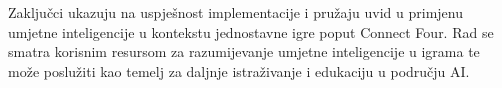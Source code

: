 \documentclass[]{foi}
\begin{document}
Zaključci ukazuju na uspješnost implementacije i pružaju uvid u primjenu umjetne inteligencije u kontekstu jednostavne igre poput Connect Four. Rad se smatra korisnim resursom za razumijevanje umjetne inteligencije u igrama te može poslužiti kao temelj za daljnje istraživanje i edukaciju u području AI.



\makebackmatter

\nocite{pygame,Geeksforgeeks,TheSharperDev,techwithtim,OpenAI}
\end{document}
